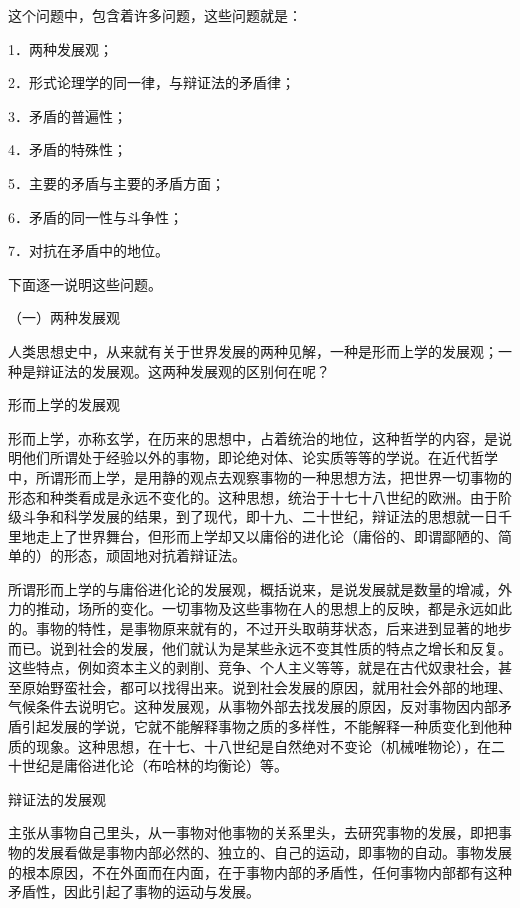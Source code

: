 \documentclass[UTF8, 12pt, a4paper]{ctexrep}
\begin{document}
这个问题中，包含着许多问题，这些问题就是：

1．两种发展观；

2．形式论理学的同一律，与辩证法的矛盾律；

3．矛盾的普遍性；

4．矛盾的特殊性；

5．主要的矛盾与主要的矛盾方面；

6．矛盾的同一性与斗争性；

7．对抗在矛盾中的地位。

下面逐一说明这些问题。

（一）两种发展观

人类思想史中，从来就有关于世界发展的两种见解，一种是形而上学的发展观；一种是辩证法的发展观。这两种发展观的区别何在呢？

形而上学的发展观

形而上学，亦称玄学，在历来的思想中，占着统治的地位，这种哲学的内容，是说明他们所谓处于经验以外的事物，即论绝对体、论实质等等的学说。在近代哲学中，所谓形而上学，是用静的观点去观察事物的一种思想方法，把世界一切事物的形态和种类看成是永远不变化的。这种思想，统治于十七十八世纪的欧洲。由于阶级斗争和科学发展的结果，到了现代，即十九、二十世纪，辩证法的思想就一日千里地走上了世界舞台，但形而上学却又以庸俗的进化论（庸俗的、即谓鄙陋的、简单的）的形态，顽固地对抗着辩证法。

所谓形而上学的与庸俗进化论的发展观，概括说来，是说发展就是数量的增减，外力的推动，场所的变化。一切事物及这些事物在人的思想上的反映，都是永远如此的。事物的特性，是事物原来就有的，不过开头取萌芽状态，后来进到显著的地步而已。说到社会的发展，他们就认为是某些永远不变其性质的特点之增长和反复。这些特点，例如资本主义的剥削、竞争、个人主义等等，就是在古代奴隶社会，甚至原始野蛮社会，都可以找得出来。说到社会发展的原因，就用社会外部的地理、气候条件去说明它。这种发展观，从事物外部去找发展的原因，反对事物因内部矛盾引起发展的学说，它就不能解释事物之质的多样性，不能解释一种质变化到他种质的现象。这种思想，在十七、十八世纪是自然绝对不变论（机械唯物论），在二十世纪是庸俗进化论（布哈林的均衡论）等。

辩证法的发展观

主张从事物自己里头，从一事物对他事物的关系里头，去研究事物的发展，即把事物的发展看做是事物内部必然的、独立的、自己的运动，即事物的自动。事物发展的根本原因，不在外面而在内面，在于事物内部的矛盾性，任何事物内部都有这种矛盾性，因此引起了事物的运动与发展。
\end{document}
